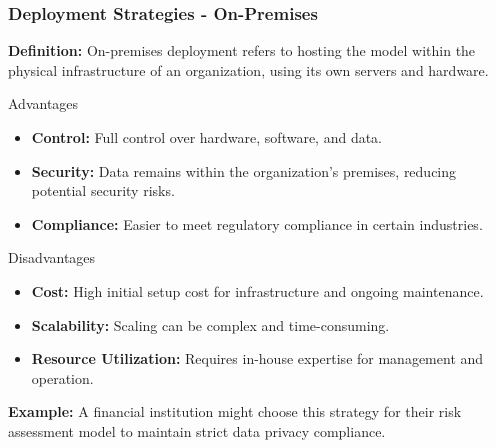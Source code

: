 \documentclass[aspectratio=169]{beamer}
\begin{document}
\begin{frame}[fragile]
    \frametitle{Deployment Strategies - On-Premises}
    \textbf{Definition:} On-premises deployment refers to hosting the model within the physical infrastructure of an organization, using its own servers and hardware.

    \begin{block}{Advantages}
        \begin{itemize}
            \item \textbf{Control:} Full control over hardware, software, and data.
            \item \textbf{Security:} Data remains within the organization's premises, reducing potential security risks.
            \item \textbf{Compliance:} Easier to meet regulatory compliance in certain industries.
        \end{itemize}
    \end{block}

    \begin{block}{Disadvantages}
        \begin{itemize}
            \item \textbf{Cost:} High initial setup cost for infrastructure and ongoing maintenance.
            \item \textbf{Scalability:} Scaling can be complex and time-consuming.
            \item \textbf{Resource Utilization:} Requires in-house expertise for management and operation.
        \end{itemize}
    \end{block}

    \textbf{Example:} A financial institution might choose this strategy for their risk assessment model to maintain strict data privacy compliance.
\end{frame}
\end{document}

